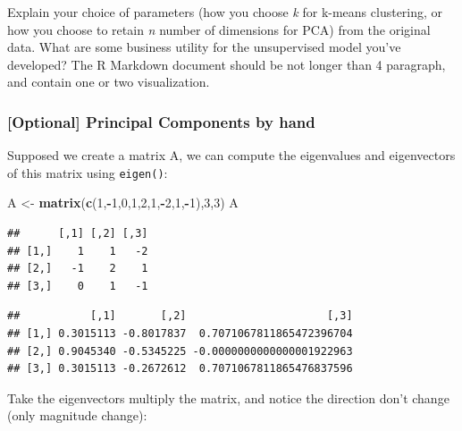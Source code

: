 \documentclass[]{article}
\newenvironment{Shaded}{\begin{snugshade}}{\end{snugshade}}
\newcommand{\DecValTok}[1]{\textcolor[rgb]{0.00,0.00,0.81}{#1}}
\newcommand{\KeywordTok}[1]{\textcolor[rgb]{0.13,0.29,0.53}{\textbf{#1}}}
\newcommand{\NormalTok}[1]{#1}
\newcommand{\OperatorTok}[1]{\textcolor[rgb]{0.81,0.36,0.00}{\textbf{#1}}}
\newcommand{\StringTok}[1]{\textcolor[rgb]{0.31,0.60,0.02}{#1}}
\begin{document}
Explain your choice of parameters (how you choose \emph{k} for k-means
clustering, or how you choose to retain \emph{n} number of dimensions
for PCA) from the original data. What are some business utility for the
unsupervised model you've developed? The R Markdown document should be
not longer than 4 paragraph, and contain one or two visualization.

\hypertarget{optional-principal-components-by-hand}{%
\subsubsection{{[}Optional{]} Principal Components by
hand}\label{optional-principal-components-by-hand}}

Supposed we create a matrix A, we can compute the eigenvalues and
eigenvectors of this matrix using \texttt{eigen()}:

\begin{Shaded}
\begin{Highlighting}[]
\NormalTok{A <-}\StringTok{ }\KeywordTok{matrix}\NormalTok{(}\KeywordTok{c}\NormalTok{(}\DecValTok{1}\NormalTok{,}\OperatorTok{-}\DecValTok{1}\NormalTok{,}\DecValTok{0}\NormalTok{,}\DecValTok{1}\NormalTok{,}\DecValTok{2}\NormalTok{,}\DecValTok{1}\NormalTok{,}\OperatorTok{-}\DecValTok{2}\NormalTok{,}\DecValTok{1}\NormalTok{,}\OperatorTok{-}\DecValTok{1}\NormalTok{),}\DecValTok{3}\NormalTok{,}\DecValTok{3}\NormalTok{)}
\NormalTok{A}
\end{Highlighting}
\end{Shaded}

\begin{verbatim}
##      [,1] [,2] [,3]
## [1,]    1    1   -2
## [2,]   -1    2    1
## [3,]    0    1   -1
\end{verbatim}

\begin{Shaded}
\end{Shaded}

\begin{verbatim}
##           [,1]       [,2]                      [,3]
## [1,] 0.3015113 -0.8017837  0.7071067811865472396704
## [2,] 0.9045340 -0.5345225 -0.0000000000000001922963
## [3,] 0.3015113 -0.2672612  0.7071067811865476837596
\end{verbatim}

Take the eigenvectors multiply the matrix, and notice the direction
don't change (only magnitude change):
\end{document}
